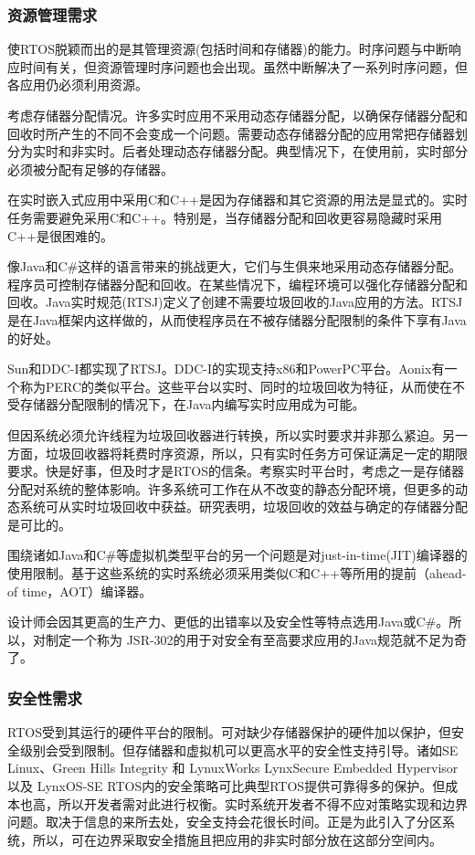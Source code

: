 \documentclass[12pt, a4paper]{article}
\begin{document}
	\subsubsection{资源管理需求}
	使RTOS脱颖而出的是其管理资源(包括时间和存储器)的能力。时序问题与中断响应时间有关，但资源管理时序问题也会出现。虽然中断解决了一系列时序问题，但各应用仍必须利用资源。
	
	考虑存储器分配情况。许多实时应用不采用动态存储器分配，以确保存储器分配和回收时所产生的不同不会变成一个问题。需要动态存储器分配的应用常把存储器划分为实时和非实时。后者处理动态存储器分配。典型情况下，在使用前，实时部分必须被分配有足够的存储器。
	
	在实时嵌入式应用中采用C和C++是因为存储器和其它资源的用法是显式的。实时任务需要避免采用C和C++。特别是，当存储器分配和回收更容易隐藏时采用C++是很困难的。
	
	像Java和C\#这样的语言带来的挑战更大，它们与生俱来地采用动态存储器分配。程序员可控制存储器分配和回收。在某些情况下，编程环境可以强化存储器分配和回收。Java实时规范(RTSJ)定义了创建不需要垃圾回收的Java应用的方法。RTSJ是在Java框架内这样做的，从而使程序员在不被存储器分配限制的条件下享有Java的好处。
	
	Sun和DDC-I都实现了RTSJ。DDC-I的实现支持x86和PowerPC平台。Aonix有一个称为PERC的类似平台。这些平台以实时、同时的垃圾回收为特征，从而使在不受存储器分配限制的情况下，在Java内编写实时应用成为可能。
	
	但因系统必须允许线程为垃圾回收器进行转换，所以实时要求并非那么紧迫。另一方面，垃圾回收器将耗费时序资源，所以，只有实时任务方可保证满足一定的期限要求。快是好事，但及时才是RTOS的信条。考察实时平台时，考虑之一是存储器分配对系统的整体影响。许多系统可工作在从不改变的静态分配环境，但更多的动态系统可从实时垃圾回收中获益。研究表明，垃圾回收的效益与确定的存储器分配是可比的。
	
	围绕诸如Java和C\#等虚拟机类型平台的另一个问题是对just-in-time(JIT)编译器的使用限制。基于这些系统的实时系统必须采用类似C和C++等所用的提前（ahead-of time，AOT）编译器。
	
	设计师会因其更高的生产力、更低的出错率以及安全性等特点选用Java或C\#。所以，对制定一个称为 JSR-302的用于对安全有至高要求应用的Java规范就不足为奇了。
	
	\subsubsection{安全性需求}
	RTOS受到其运行的硬件平台的限制。可对缺少存储器保护的硬件加以保护，但安全级别会受到限制。但存储器和虚拟机可以更高水平的安全性支持引导。诸如SE Linux、Green Hills Integrity 和 LynuxWorks LynxSecure Embedded Hypervisor以及 LynxOS-SE RTOS内的安全策略可比典型RTOS提供可靠得多的保护。但成本也高，所以开发者需对此进行权衡。实时系统开发者不得不应对策略实现和边界问题。取决于信息的来所去处，安全支持会花很长时间。正是为此引入了分区系统，所以，可在边界采取安全措施且把应用的非实时部分放在这部分空间内。
	
\end{document}
